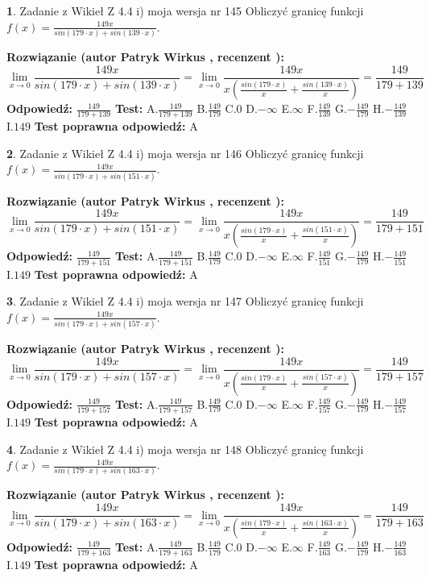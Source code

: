 \documentclass[12pt, a4paper]{article}
\theoremstyle{definition} %
\newtheorem{zad}{}
\newcommand{\zadStart}[1]{\begin{zad}#1\newline}
\newcommand{\zadStop}{\end{zad}}
\newcommand{\rozwStart}[2]{\noindent \textbf{Rozwiązanie (autor #1 , recenzent #2): }\newline}
\newcommand{\rozwStop}{\newline}
\newcommand{\odpStart}{\noindent \textbf{Odpowiedź:}\newline}
\newcommand{\odpStop}{\newline}
\newcommand{\testStart}{\noindent \textbf{Test:}\newline}
\newcommand{\testStop}{\newline}
\newcommand{\kluczStart}{\noindent \textbf{Test poprawna odpowiedź:}\newline}
\newcommand{\kluczStop}{\newline}
\begin{document}
\zadStart{Zadanie z Wikieł Z 4.4 i) moja wersja nr 145}
Obliczyć granicę funkcji $f(x)=\frac{149x}{sin(179\cdot x) +sin(139\cdot x)}$.
\zadStop
\rozwStart{Patryk Wirkus}{}
$$\lim\limits_{x\to 0}\frac{149x}{sin(179\cdot x) +sin(139\cdot x)}=\lim\limits_{x\to 0}\frac{149x}{x(\frac{sin(179\cdot x)}{x}+\frac{sin(139\cdot x)}{x})}=\frac{149}{179+139}$$
\rozwStop
\odpStart
$\frac{149}{179+139}$
\odpStop
\testStart
A.$\frac{149}{179+139}$
B.$\frac{149}{179}$
C.$0$
D.$-\infty$
E.$\infty$
F.$\frac{149}{139}$
G.$-\frac{149}{179}$
H.$-\frac{149}{139}$
I.$149$
\testStop
\kluczStart
A
\kluczStop



\zadStart{Zadanie z Wikieł Z 4.4 i) moja wersja nr 146}
Obliczyć granicę funkcji $f(x)=\frac{149x}{sin(179\cdot x) +sin(151\cdot x)}$.
\zadStop
\rozwStart{Patryk Wirkus}{}
$$\lim\limits_{x\to 0}\frac{149x}{sin(179\cdot x) +sin(151\cdot x)}=\lim\limits_{x\to 0}\frac{149x}{x(\frac{sin(179\cdot x)}{x}+\frac{sin(151\cdot x)}{x})}=\frac{149}{179+151}$$
\rozwStop
\odpStart
$\frac{149}{179+151}$
\odpStop
\testStart
A.$\frac{149}{179+151}$
B.$\frac{149}{179}$
C.$0$
D.$-\infty$
E.$\infty$
F.$\frac{149}{151}$
G.$-\frac{149}{179}$
H.$-\frac{149}{151}$
I.$149$
\testStop
\kluczStart
A
\kluczStop



\zadStart{Zadanie z Wikieł Z 4.4 i) moja wersja nr 147}
Obliczyć granicę funkcji $f(x)=\frac{149x}{sin(179\cdot x) +sin(157\cdot x)}$.
\zadStop
\rozwStart{Patryk Wirkus}{}
$$\lim\limits_{x\to 0}\frac{149x}{sin(179\cdot x) +sin(157\cdot x)}=\lim\limits_{x\to 0}\frac{149x}{x(\frac{sin(179\cdot x)}{x}+\frac{sin(157\cdot x)}{x})}=\frac{149}{179+157}$$
\rozwStop
\odpStart
$\frac{149}{179+157}$
\odpStop
\testStart
A.$\frac{149}{179+157}$
B.$\frac{149}{179}$
C.$0$
D.$-\infty$
E.$\infty$
F.$\frac{149}{157}$
G.$-\frac{149}{179}$
H.$-\frac{149}{157}$
I.$149$
\testStop
\kluczStart
A
\kluczStop



\zadStart{Zadanie z Wikieł Z 4.4 i) moja wersja nr 148}
Obliczyć granicę funkcji $f(x)=\frac{149x}{sin(179\cdot x) +sin(163\cdot x)}$.
\zadStop
\rozwStart{Patryk Wirkus}{}
$$\lim\limits_{x\to 0}\frac{149x}{sin(179\cdot x) +sin(163\cdot x)}=\lim\limits_{x\to 0}\frac{149x}{x(\frac{sin(179\cdot x)}{x}+\frac{sin(163\cdot x)}{x})}=\frac{149}{179+163}$$
\rozwStop
\odpStart
$\frac{149}{179+163}$
\odpStop
\testStart
A.$\frac{149}{179+163}$
B.$\frac{149}{179}$
C.$0$
D.$-\infty$
E.$\infty$
F.$\frac{149}{163}$
G.$-\frac{149}{179}$
H.$-\frac{149}{163}$
I.$149$
\testStop
\kluczStart
A
\kluczStop
\end{document}
